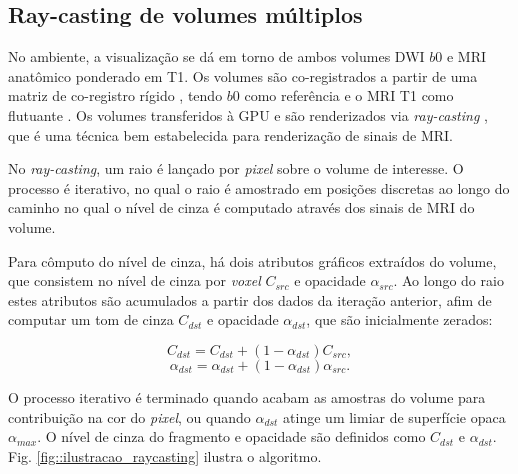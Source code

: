 \subsection{Ray-casting de volumes múltiplos}

No ambiente, a visualização se dá em torno de ambos volumes DWI $b0$ e MRI anatômico ponderado em T1. Os volumes são co-registrados a partir de uma matriz de co-registro rígido \cite{ting2014}, tendo $b0$ como referência e o MRI T1 como flutuante \cite{voltoline2021}. Os volumes transferidos à GPU e são renderizados via \textit{ray-casting} \cite{kruger2003}, que é uma técnica bem estabelecida para renderização de sinais de MRI.

No \textit{ray-casting}, um raio é lançado por \textit{pixel} sobre o volume de interesse. O processo é iterativo, no qual o raio é amostrado em posições discretas ao longo do caminho no qual o nível de cinza é computado através dos sinais de MRI do volume.

Para cômputo do nível de cinza, há dois atributos gráficos extraídos do volume, que consistem no nível de cinza por \textit{voxel} $C_{src}$ e opacidade $\alpha_{src}$. Ao longo do raio estes atributos são acumulados a partir dos dados da iteração anterior, afim de computar um tom de cinza $C_{dst}$ e opacidade $\alpha_{dst}$, que são inicialmente zerados:

\begin{equation}
    C_{dst} = C_{dst} + (1-\alpha_{dst})C_{src},
\end{equation}
\begin{equation}
    \alpha_{dst} = \alpha_{dst} + (1-\alpha_{dst})\alpha_{src}.
\end{equation}

O processo iterativo é terminado quando acabam as amostras do volume para contribuição na cor do \textit{pixel}, ou quando $\alpha_{dst}$ atinge um limiar de superfície opaca $\alpha_{max}$. O nível de cinza do fragmento e opacidade são definidos como $C_{dst}$ e $\alpha_{dst}$. Fig. \ref{fig::ilustracao_raycasting} ilustra o algoritmo.

